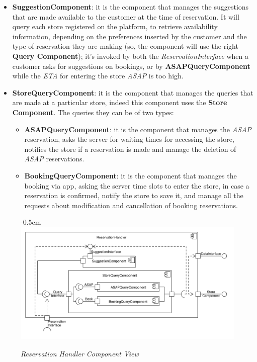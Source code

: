 \documentclass{article}
\begin{document}
				\begin{itemize}
					\item {\bfseries SuggestionComponent}: it is the component that manages the suggestions that are made available to the customer at the time of reservation. It will query each store registered on the platform, to retrieve availability information, depending on the preferences inserted by the customer and the type of reservation they are making (so, the component will use the right {\bfseries Query Component}); it’s invoked by both the \emph{ReservationInterface} when a customer asks for suggestions on bookings, or by {\bfseries ASAPQueryComponent} while the \emph{ETA} for entering the store \emph{ASAP} is too high.
					
					\item {\bfseries StoreQueryComponent}: it is the component that manages the queries that are made at a particular store, indeed this component uses the {\bfseries Store Component}. The queries they can be of two types:
					
					\begin{itemize}
						\item {\bfseries ASAPQueryComponent}: it is the component that manages the \emph{ASAP} reservation, asks the server for waiting times for accessing the store, notifies the store if a reservation is made and manage the deletion of \emph{ASAP} reservations.
						
						\item {\bfseries BookingQueryComponent}: it is the component that manages the booking via app, asking the server time slots to enter the store, in case a reservation is confirmed, notify the store to save it, and manage all the requests about modification and cancellation of booking reservations.		
					\end{itemize}
				\end{itemize}
				\bigskip
				\begin{figure}[h]
					\begin{adjustwidth} {-0.5cm}{}
						\centering
						\includegraphics[scale=0.5]{Component Diagrams/ReservationHandlerComponentView.pdf}\\
					\end{adjustwidth}
					\caption{\emph{Reservation Handler Component View}}
				\end{figure}
				\newpage
			
\end{document}
